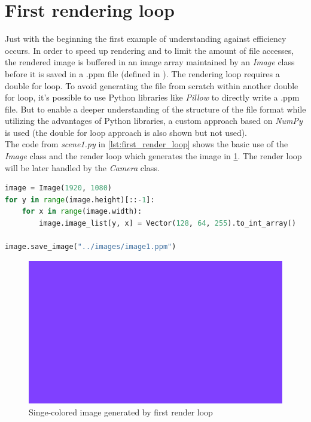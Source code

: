 \documentclass[]{article}
\begin{document}
	\section{First rendering loop}
	Just with the beginning the first example of understanding against efficiency occurs. In order to speed up rendering and to limit the amount of file accesses, the rendered image is buffered in an image array maintained by an \emph{Image} class before it is saved in a .ppm file (defined in \cite{PPM}). The rendering loop requires a double for loop. To avoid generating the file from scratch within another double for loop, it’s possible to use Python libraries like \emph{Pillow} to directly write a .ppm file. But to enable a deeper understanding of the structure of the file format while utilizing the advantages of Python libraries, a custom approach based on \emph{NumPy} is used (the double for loop approach is also shown but not used).
	\\
	The code from \emph{scene1.py} in \cref{lst:first_render_loop} shows the basic use of the \emph{Image} class and the render loop which generates the image in \cref{fig:image1}. The render loop will be later handled by the \emph{Camera} class.
	
	\begin{lstlisting}[caption={Example for a basic render loop}, language=Python, label=lst:first_render_loop]
image = Image(1920, 1080)
for y in range(image.height)[::-1]:
	for x in range(image.width):
		image.image_list[y, x] = Vector(128, 64, 255).to_int_array()

image.save_image("../images/image1.ppm")
	\end{lstlisting}

	\begin{figure}[h]
		\centering
		\includegraphics[width=0.9\linewidth]{image1}
		\caption{Singe-colored image generated by first render loop}
		\label{fig:image1}
	\end{figure}
\end{document}
